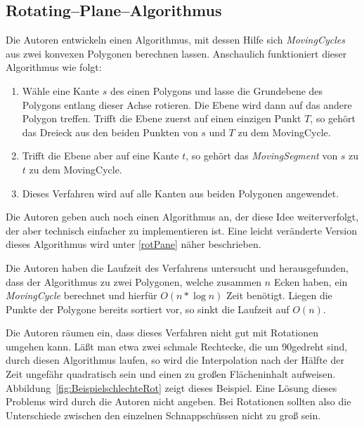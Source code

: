 \subsection{Rotating--Plane--Algorithmus}

Die Autoren entwickeln einen Algorithmus, mit dessen Hilfe sich \textit{MovingCycles} aus zwei konvexen Polygonen berechnen lassen. Anschaulich funktioniert dieser Algorithmus wie folgt:

\begin{enumerate}

\item Wähle eine Kante $s$ des einen Polygons und lasse die Grundebene des Polygons entlang dieser Achse rotieren. Die Ebene wird dann auf das andere Polygon treffen. Trifft die Ebene zuerst auf einen einzigen Punkt $T$, so gehört das Dreieck aus den beiden Punkten von $s$ und $T$ zu dem MovingCycle.

\item Trifft die Ebene aber auf eine Kante $t$, so gehört das \textit{MovingSegment} von $s$ zu $t$ zu dem MovingCycle.

\item Dieses Verfahren wird auf alle Kanten aus beiden Polygonen angewendet.
\end{enumerate}
Die Autoren geben auch noch einen Algorithmus an, der diese Idee weiterverfolgt, der aber technisch einfacher zu implementieren ist. Eine leicht veränderte Version dieses Algorithmus wird unter \vref{rotPane} näher beschrieben.

Die Autoren haben die Laufzeit des Verfahrens untersucht und herausgefunden, dass der Algorithmus zu zwei Polygonen, welche zusammen $n$ Ecken haben, ein \textit{MovingCycle} berechnet und hierfür $O(n*\log{n})$ Zeit benötigt. Liegen die Punkte der Polygone bereits sortiert vor, so sinkt die Laufzeit auf $O(n)$.

Die Autoren räumen ein, dass dieses Verfahren nicht gut mit Rotationen umgehen kann. Läßt man etwa zwei schmale Rechtecke, die um 90\degree gedreht sind, durch diesen Algorithmus laufen, so wird die Interpolation nach der Hälfte der Zeit ungefähr quadratisch  sein und einen zu großen Flächeninhalt aufweisen. Abbildung~\vref{fig:BeispielschlechteRot} zeigt dieses Beispiel. Eine Lösung dieses Problems wird durch die Autoren nicht angeben. Bei Rotationen sollten also die Unterschiede zwischen den einzelnen Schnappschüssen nicht zu groß sein.

